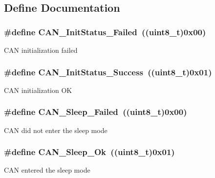 \subsection{Define Documentation}
\hypertarget{group__CAN__sleep__constants_ga095c319e8c54c974eb2b6eeadf180d96}{
\subsubsection[{CAN\_\-InitStatus\_\-Failed}]{\setlength{\rightskip}{0pt plus 5cm}\#define CAN\_\-InitStatus\_\-Failed~((uint8\_\-t)0x00)}}
\label{group__CAN__sleep__constants_ga095c319e8c54c974eb2b6eeadf180d96}
CAN initialization failed \hypertarget{group__CAN__sleep__constants_ga6bed5957af8f2f6b00568e15ccac5772}{
\subsubsection[{CAN\_\-InitStatus\_\-Success}]{\setlength{\rightskip}{0pt plus 5cm}\#define CAN\_\-InitStatus\_\-Success~((uint8\_\-t)0x01)}}
\label{group__CAN__sleep__constants_ga6bed5957af8f2f6b00568e15ccac5772}
CAN initialization OK \hypertarget{group__CAN__sleep__constants_ga169500ab7169c4e9c7e9e4ea34b3e070}{
\subsubsection[{CAN\_\-Sleep\_\-Failed}]{\setlength{\rightskip}{0pt plus 5cm}\#define CAN\_\-Sleep\_\-Failed~((uint8\_\-t)0x00)}}
\label{group__CAN__sleep__constants_ga169500ab7169c4e9c7e9e4ea34b3e070}
CAN did not enter the sleep mode \hypertarget{group__CAN__sleep__constants_gaf5c4e9d32d4faff9d0bf61e153ed7998}{
\subsubsection[{CAN\_\-Sleep\_\-Ok}]{\setlength{\rightskip}{0pt plus 5cm}\#define CAN\_\-Sleep\_\-Ok~((uint8\_\-t)0x01)}}
\label{group__CAN__sleep__constants_gaf5c4e9d32d4faff9d0bf61e153ed7998}
CAN entered the sleep mode 